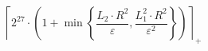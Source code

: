 \[\left\lceil 2^{27} \cdot \left(1 + \min\left\{ \frac{L_2 \cdot R^{2}}{\varepsilon}, \frac{L_1^{2} \cdot R^{2}}{\varepsilon^{2}} \right\}\right) \right\rceil_{+}\]
